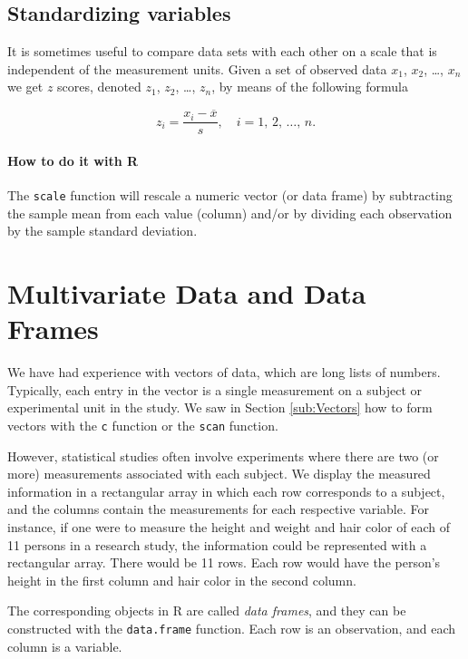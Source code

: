 \documentclass[captions=tableheading]{scrbook}
\begin{document}
\subsection{Standardizing variables}
\label{sec-2-4-5}


It is sometimes useful to compare data sets with each other on a scale that is independent of the measurement units. Given a set of observed data \(x_{1}\), \(x_{2}\), \ldots{}, \(x_{n}\) we get \(z\) scores, denoted \(z_{1}\), \(z_{2}\), \ldots{}, \(z_{n}\), by means of the following formula

\[
z_{i}=\frac{x_{i}-\overline{x}}{s},\quad i=1,\,2,\,\ldots,\, n.
\]


\paragraph*{How to do it with \textsf{R}}

The \texttt{scale} function will rescale a numeric vector (or data frame) by subtracting the sample mean from each value (column) and/or by dividing each observation by the sample standard deviation.
\section{Multivariate Data and Data Frames}
\label{sec-2-5}

\label{sec:multivariate-data}

We have had experience with vectors of data, which are long lists of numbers. Typically, each entry in the vector is a single measurement on a subject or experimental unit in the study. We saw in Section \ref{sub:Vectors} how to form vectors with the \texttt{c} function or the \texttt{scan} function. 

However, statistical studies often involve experiments where there are two (or more) measurements associated with each subject. We display the measured information in a rectangular array in which each row corresponds to a subject, and the columns contain the measurements for each respective variable. For instance, if one were to measure the height and weight and hair color of each of 11 persons in a research study, the information could be represented with a rectangular array. There would be 11 rows. Each row would have the person's height in the first column and hair color in the second column.

The corresponding objects in \textsf{R} are called \emph{data frames}, and they can be constructed with the \texttt{data.frame} function. Each row is an observation, and each column is a variable.
\end{document}
